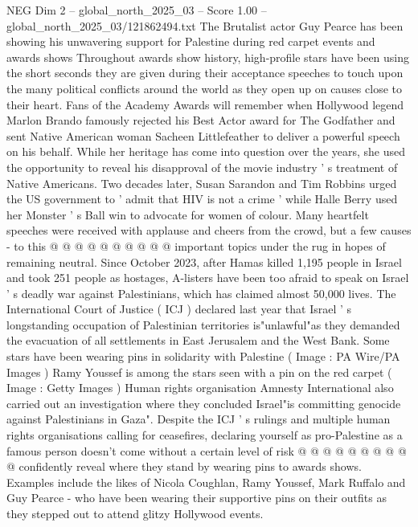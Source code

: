 \begin{textsample}{NEG Dim 2 – global\_north\_2025\_03 – Score 1.00 – global\_north\_2025\_03/121862494.txt}  \label{ex:f2_neg_043}
The Brutalist actor Guy Pearce has been showing his unwavering support for Palestine during red carpet events and awards shows Throughout awards show history, high-profile stars have been using the short seconds they are given during their acceptance speeches to touch upon the many political conflicts around the world as they open up on causes close to their heart.
Fans of the Academy Awards will remember when Hollywood legend Marlon Brando famously rejected his Best Actor award for The Godfather and sent Native American woman Sacheen Littlefeather to deliver a powerful speech on his behalf.
While her heritage has come into question over the years, she used the opportunity to reveal his disapproval of the movie industry ' s treatment of Native Americans.
Two decades later, Susan Sarandon and Tim Robbins urged the US government to ' admit that HIV is not a crime ' while Halle Berry used her Monster ' s Ball win to advocate for women of colour.
Many heartfelt speeches were received with applause and cheers from the crowd, but a few causes - to this @ @ @ @ @ @ @ @ @ @ important topics under the rug in hopes of remaining neutral.
Since October 2023, after Hamas killed 1,195 people in Israel and took 251 people as hostages, A-listers have been too afraid to speak on Israel ' s deadly war against Palestinians, which has claimed almost 50,000 lives.
The International Court of Justice ( ICJ ) declared last year that Israel ' s longstanding occupation of Palestinian territories is"unlawful"as they demanded the evacuation of all settlements in East Jerusalem and the West Bank.
Some stars have been wearing pins in solidarity with Palestine ( Image : PA Wire/PA Images ) Ramy Youssef is among the stars seen with a pin on the red carpet ( Image : Getty Images ) Human rights organisation Amnesty International also carried out an investigation where they concluded Israel"is committing genocide against Palestinians in Gaza".
Despite the ICJ ' s rulings and multiple human rights organisations calling for ceasefires, declaring yourself as pro-Palestine as a famous person doesn't come without a certain level of risk @ @ @ @ @ @ @ @ @ @ confidently reveal where they stand by wearing pins to awards shows.
Examples include the likes of Nicola Coughlan, Ramy Youssef, Mark Ruffalo and Guy Pearce - who have been wearing their supportive pins on their outfits as they stepped out to attend glitzy Hollywood events.

\end{textsample}
